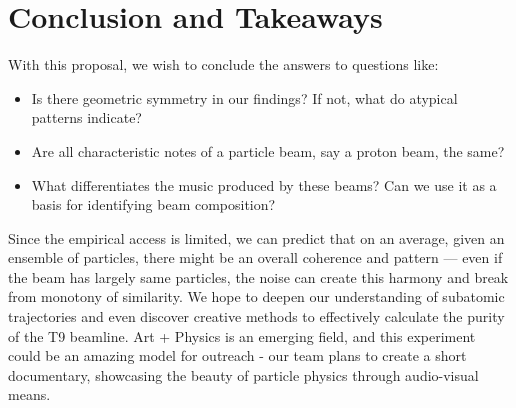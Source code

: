 \section{\textbf{Conclusion and Takeaways}}

With this proposal, we wish to conclude the answers to questions like:

\begin{itemize}
    \item Is there geometric symmetry in our findings? If not, what do atypical patterns indicate?
    \item Are all characteristic notes of a particle beam, say a proton beam, the same?
    \item What differentiates the music produced by these beams? Can we use it as a basis for identifying beam composition?
\end{itemize}  
Since the empirical access is limited, we can predict that on an average, given an ensemble of particles, there might be an overall coherence and pattern — even if the beam has largely same particles, the noise can create this harmony and break from monotony of similarity. We hope to deepen our understanding of subatomic trajectories and even discover creative methods to effectively calculate the purity of the T9 beamline.
Art + Physics is an emerging field, and this experiment could be an amazing model for outreach - our team plans to create a short documentary, showcasing the beauty of particle physics through audio-visual means. 
